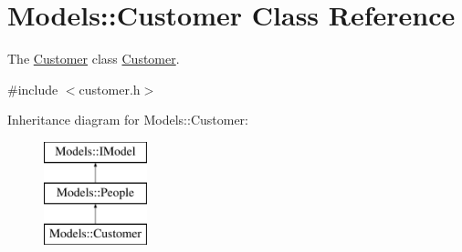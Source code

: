 \hypertarget{classModels_1_1Customer}{\section{Models\-:\-:Customer Class Reference}
\label{classModels_1_1Customer}
}


The \hyperlink{classModels_1_1Customer}{Customer} class \hyperlink{classModels_1_1Customer}{Customer}.  




{\ttfamily \#include $<$customer.\-h$>$}

Inheritance diagram for Models\-:\-:Customer\-:\begin{figure}[H]
\begin{center}
\leavevmode
\includegraphics[height=3.000000cm]{db/dd7/classModels_1_1Customer}
\end{center}
\end{figure}

